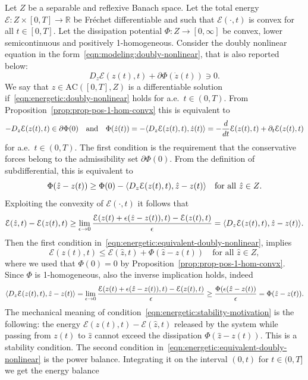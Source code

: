 \documentclass[a4paper,10pt,oneside]{amsbook}
\numberwithin{section}{chapter}
\numberwithin{equation}{chapter}
\theoremstyle{definition}
\DeclarePairedDelimiter{\dual}{\langle}{\rangle}
\begin{document}
Let $Z$ be a separable and reflexive Banach space. Let the total energy $\mathcal{E}\colon Z\times[0,T]\to\mathbb{R}$ be Fréchet differentiable and such that $\mathcal{E}(\cdot,t)$ is convex for all $t\in[0,T]$. Let the dissipation potential $\Phi\colon Z\to[0,\infty]$ be convex, lower semicontinuous and positively 1-homogeneous. Consider the doubly nonlinear equation in the form~\eqref{eqn:modeling:doubly-nonlinear}, that is also reported below:
\begin{equation}
\label{eqn:energetic:doubly-nonlinear}
D_z\mathcal{E}(z(t),t)+\partial\Phi(\dot z(t))\ni 0.
\end{equation}
We say that $z\in\text{AC}([0,T],Z)$ is a differentiable solution if~\eqref{eqn:energetic:doubly-nonlinear} holds for a.e.\ $t\in(0,T)$. From Proposition~\ref{prop:prop-pos-1-hom-convx} this is equivalent to
\begin{equation}
\label{eqn:energetic:equivalent-doubly-nonlinear}
-D_z\mathcal{E}(z(t),t)\in\partial\Phi(0)\quad\text{and}\quad\Phi(\dot z(t))=-\dual{D_z\mathcal{E}(z(t),t),\dot z(t)}=-\frac{d}{dt}\mathcal{E}(z(t),t)+\partial_t\mathcal{E}(z(t),t)
\end{equation}
for a.e.\ $t\in(0,T)$. The first condition is the requirement that the conservative forces belong to the admissibility set $\partial\Phi(0)$. From the definition of subdifferential, this is equivalent to
\[
\Phi(\hat z-z(t))\ge\Phi(0)-\dual{D_z\mathcal{E}(z(t),t),\hat z-z(t)}\quad\text{for all $\hat{z}\in Z$}.
\]
Exploiting the convexity of $\mathcal{E}(\cdot,t)$ it follows that
\[
\mathcal{E}(\hat{z},t)-\mathcal{E}(z(t),t)\ge\lim_{\epsilon\to 0}\frac{\mathcal{E}(z(t)+\epsilon(\hat{z}-z(t)),t)-\mathcal{E}(z(t),t)}{\epsilon}=\dual{D_z\mathcal{E}(z(t),t),\hat{z}-z(t)}.
\]
Then the first condition in~\eqref{eqn:energetic:equivalent-doubly-nonlinear}, implies
\begin{equation}
\label{eqn:energetic:stability-motivation}
\mathcal{E}(z(t),t)\le\mathcal{E}(\hat{z},t)+\Phi(\hat{z}-z(t))\quad\text{for all $\hat{z}\in Z$},
\end{equation}
where we used that $\Phi(0)=0$ by Proposition~\ref{prop:prop-pos-1-hom-convx}. Since $\Phi$ is 1-homogeneous, also the inverse implication holds, indeed
\[
\dual{D_z\mathcal{E}(z(t),t),\hat{z}-z(t)}=\lim_{\epsilon\to 0}\frac{\mathcal{E}(z(t)+\epsilon(\hat{z}-z(t)),t)-\mathcal{E}(z(t),t)}{\epsilon}\ge\frac{\Phi(\epsilon(\hat{z}-z(t))}{\epsilon}=\Phi(\hat{z}-z(t)).
\]
The mechanical meaning of condition~\eqref{eqn:energetic:stability-motivation} is the following: the energy $\mathcal{E}(z(t),t)-\mathcal{E}(\hat{z},t)$ released by the system while passing from $z(t)$ to $\hat{z}$ cannot exceed the dissipation $\Phi(\hat{z}-z(t))$. This is a stability condition. The second condition in~\eqref{eqn:energetic:equivalent-doubly-nonlinear} is the power balance. Integrating it on the interval $(0,t)$ for $t\in(0,T]$ we get the energy balance
\end{document}
